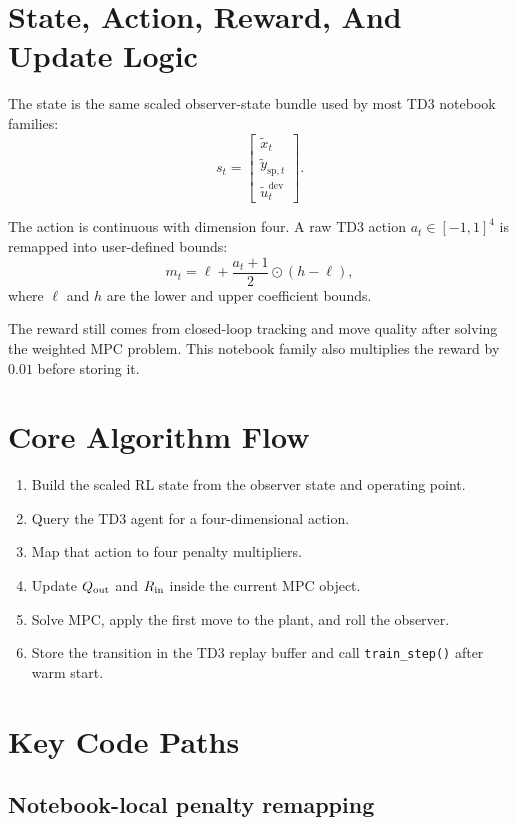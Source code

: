\documentclass[11pt]{article}
\begin{document}
\section*{State, Action, Reward, And Update Logic}

The state is the same scaled observer-state bundle used by most TD3 notebook
families:
\[
s_t =
\begin{bmatrix}
\tilde{x}_{t} \\
\tilde{y}_{\mathrm{sp},t} \\
\tilde{u}_{t}^{\mathrm{dev}}
\end{bmatrix}.
\]

The action is continuous with dimension four. A raw TD3 action
$a_t \in [-1, 1]^4$ is remapped into user-defined bounds:
\[
m_t = \ell + \frac{a_t + 1}{2} \odot (h - \ell),
\]
where $\ell$ and $h$ are the lower and upper coefficient bounds.

The reward still comes from closed-loop tracking and move quality after solving
the weighted MPC problem. This notebook family also multiplies the reward by
$0.01$ before storing it.

\section*{Core Algorithm Flow}

\begin{enumerate}
\item Build the scaled RL state from the observer state and operating point.
\item Query the TD3 agent for a four-dimensional action.
\item Map that action to four penalty multipliers.
\item Update $Q_{\mathrm{out}}$ and $R_{\mathrm{in}}$ inside the current MPC object.
\item Solve MPC, apply the first move to the plant, and roll the observer.
\item Store the transition in the TD3 replay buffer and call
      \texttt{train\_step()} after warm start.
\end{enumerate}

\section*{Key Code Paths}

\subsection*{Notebook-local penalty remapping}
\end{document}
